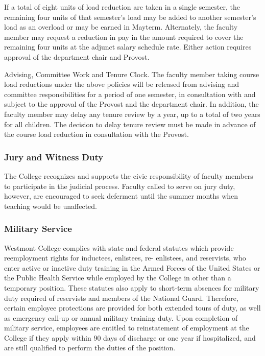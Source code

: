 				If a total of eight units of load reduction are taken in a single semester, the remaining four units of that semester's load may be added to another semester's load as an overload or may be earned in Mayterm. Alternately, the faculty member may request a reduction in pay in the amount required to cover the remaining four units at the adjunct salary schedule rate. Either action requires approval of the department chair and Provost.

				Advising, Committee Work and Tenure Clock.  The faculty member taking course load reductions under the above policies will be released from advising and committee responsibilities for a period of one semester, in consultation with and subject to the approval of the Provost and the department chair. In addition, the faculty member may delay any tenure review by a year, up to a total of two years for all children.  The decision to delay tenure review must be made in advance of the course load reduction in consultation with the Provost.

		\subsubsection{Jury and Witness Duty}
			The College recognizes and supports the civic responsibility of faculty members to participate in the judicial process.  Faculty called to serve on jury duty, however, are encouraged to seek deferment until the summer months when teaching would be unaffected.

		\subsubsection{Military Service}
			Westmont College complies with state and federal statutes which provide reemployment rights for inductees, enlistees, re- enlistees, and reservists, who enter active or inactive duty training in the Armed Forces of the United States or the Public Health Service while employed by the College in other than a temporary position.  These statutes also apply to short-term absences for military duty required of reservists and members of the National Guard.  Therefore, certain employee protections are provided for both extended tours of duty, as well as emergency call-up or annual military training duty.  Upon completion of military service, employees are entitled to reinstatement of employment at the College if they apply within 90 days of discharge or one year if hospitalized, and are still qualified to perform the duties of the position.

